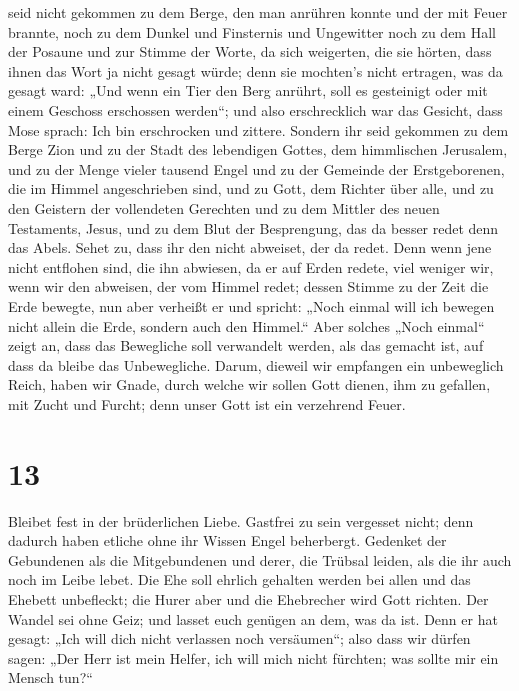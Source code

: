 seid nicht gekommen zu dem Berge, den man anrühren konnte und der mit
Feuer brannte, noch zu dem Dunkel und Finsternis und Ungewitter
 noch zu dem Hall der Posaune und zur Stimme der Worte,
da sich weigerten, die sie hörten, dass ihnen das Wort ja nicht gesagt
würde;  denn sie mochten's nicht ertragen, was da gesagt
ward: „Und wenn ein Tier den Berg anrührt, soll es gesteinigt oder mit
einem Geschoss erschossen werden``;  und also
erschrecklich war das Gesicht, dass Mose sprach: Ich bin erschrocken und
zittere.  Sondern ihr seid gekommen zu dem Berge Zion und
zu der Stadt des lebendigen Gottes, dem himmlischen Jerusalem, und zu
der Menge vieler tausend Engel  und zu der Gemeinde der
Erstgeborenen, die im Himmel angeschrieben sind, und zu Gott, dem
Richter über alle, und zu den Geistern der vollendeten Gerechten
 und zu dem Mittler des neuen Testaments, Jesus, und zu
dem Blut der Besprengung, das da besser redet denn das Abels.
 Sehet zu, dass ihr den nicht abweiset, der da redet.
Denn wenn jene nicht entflohen sind, die ihn abwiesen, da er auf Erden
redete, viel weniger wir, wenn wir den abweisen, der vom Himmel redet;
 dessen Stimme zu der Zeit die Erde bewegte, nun aber
verheißt er und spricht: „Noch einmal will ich bewegen nicht allein die
Erde, sondern auch den Himmel.``  Aber solches „Noch
einmal`` zeigt an, dass das Bewegliche soll verwandelt werden, als das
gemacht ist, auf dass da bleibe das Unbewegliche.  Darum,
dieweil wir empfangen ein unbeweglich Reich, haben wir Gnade, durch
welche wir sollen Gott dienen, ihm zu gefallen, mit Zucht und Furcht;
 denn unser Gott ist ein verzehrend Feuer.

\hypertarget{section-12}{%
\section{13}\label{section-12}}

 Bleibet fest in der brüderlichen Liebe. 
Gastfrei zu sein vergesset nicht; denn dadurch haben etliche ohne ihr
Wissen Engel beherbergt.  Gedenket der Gebundenen als die
Mitgebundenen und derer, die Trübsal leiden, als die ihr auch noch im
Leibe lebet.  Die Ehe soll ehrlich gehalten werden bei
allen und das Ehebett unbefleckt; die Hurer aber und die Ehebrecher wird
Gott richten.  Der Wandel sei ohne Geiz; und lasset euch
genügen an dem, was da ist. Denn er hat gesagt: „Ich will dich nicht
verlassen noch versäumen``;  also dass wir dürfen sagen:
„Der Herr ist mein Helfer, ich will mich nicht fürchten; was sollte mir
ein Mensch tun?{}``

